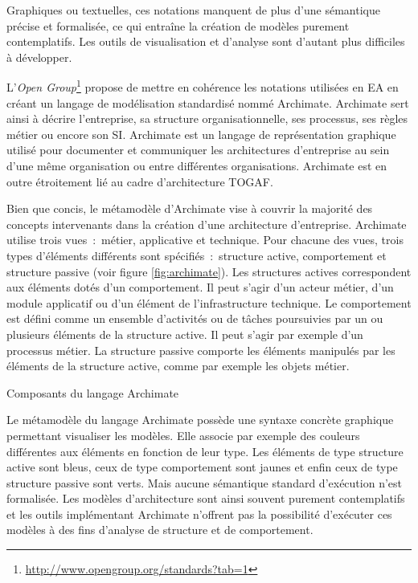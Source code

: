 Graphiques ou textuelles, ces notations manquent de plus d'une sémantique précise et formalisée, ce qui entraîne la création de modèles purement contemplatifs. Les outils de visualisation et d'analyse sont d'autant plus difficiles à développer.

L'\textit{Open Group}\footnote{\url{http://www.opengroup.org/standards?tab=1}} propose de mettre en cohérence les notations utilisées en EA en créant un langage de modélisation standardisé nommé Archimate. Archimate sert ainsi à décrire l'entreprise, sa structure organisationnelle, ses processus, ses règles métier ou encore son SI. Archimate est un langage de représentation graphique utilisé pour documenter et communiquer les architectures d'entreprise au sein d'une même organisation ou entre différentes organisations. Archimate est en outre étroitement lié au cadre d'architecture TOGAF. 

Bien que concis, le métamodèle d'Archimate vise à couvrir la majorité des concepts intervenants dans la création d'une architecture d'entreprise. Archimate utilise trois vues~:~métier, applicative et technique. Pour chacune des vues, trois types d'éléments différents sont spécifiés~:~structure active, comportement et structure passive (voir figure \ref{fig:archimate}). Les structures actives correspondent aux éléments dotés d'un comportement. Il peut s'agir d'un acteur métier, d'un module applicatif ou d'un élément de l'infrastructure technique. Le comportement est défini comme un ensemble d'activités ou de tâches poursuivies par un ou plusieurs éléments de la structure active. Il peut s'agir par exemple d'un processus métier. La structure passive comporte les éléments manipulés par les éléments de la structure active, comme par exemple les objets métier. 

\begin{table}[!ht]
    \vspace*{0.5em}
    \begin{center}
        
    \end{center}
 \caption{Composants du langage Archimate}
 \label{fig:archimate}
\end{table}

Le métamodèle du langage Archimate possède une syntaxe concrète graphique permettant visualiser les modèles. Elle associe par exemple des couleurs différentes aux éléments en fonction de leur type. Les éléments de type structure active sont bleus, ceux de type comportement sont jaunes et enfin ceux de type structure passive sont verts. Mais aucune sémantique standard d'exécution n'est formalisée. Les modèles d'architecture sont ainsi souvent purement contemplatifs et les outils implémentant Archimate n'offrent pas la possibilité d'exécuter ces modèles à des fins d'analyse de structure et de comportement. 

